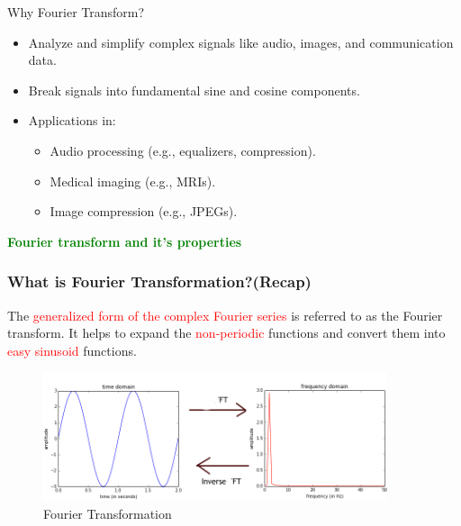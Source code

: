 \documentclass[aspectratio=1610]{beamer}
\begin{document}
\begin{frame}{Why Fourier Transform?}
    \begin{itemize}
        \item<1-> Analyze and simplify complex signals like audio, images, and communication data.
        \item<2-> Break signals into fundamental sine and cosine components.
        \item<3-> Applications in:
        \begin{itemize}
            \item Audio processing (e.g., equalizers, compression).
            \item Medical imaging (e.g., MRIs).
            \item Image compression (e.g., JPEGs).
        \end{itemize}
    \end{itemize}
    \pause
\end{frame}

\begin{frame}
\textcolor{green}{\textbf{Fourier transform and it's properties}}
\end{frame}

\begin{frame}
    \frametitle{What is Fourier Transformation?(Recap)}
    The \textcolor{red}{generalized form of the complex Fourier series} is referred to as the Fourier transform.
    It helps to expand the \textcolor{red}{non-periodic} functions and convert them into \textcolor{red}{easy sinusoid} functions.
    \begin{figure}
        \centering
        \includegraphics[width=0.9\textwidth]{images/time_freq_domain.png}
        \caption{Fourier Transformation}
    \end{figure}
\end{frame}
\end{document}
